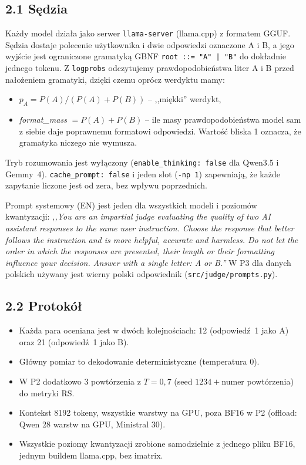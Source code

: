 \documentclass[10pt,a4paper]{article}
\begin{document}
\subsection*{2.1 Sędzia}
Każdy model działa jako serwer \texttt{llama-server} (llama.cpp) z formatem GGUF. Sędzia dostaje polecenie użytkownika i dwie odpowiedzi oznaczone A i B, a jego wyjście jest ograniczone gramatyką GBNF \texttt{root ::= "A" | "B"} do dokładnie jednego tokenu. Z \texttt{logprobs} odczytujemy prawdopodobieństwa liter A i B przed nałożeniem gramatyki, dzięki czemu oprócz werdyktu mamy:
\begin{itemize}
  \item $p_A = P(A)/(P(A)+P(B))$ -- ,,miękki'' werdykt,
  \item \emph{format\_mass} $=P(A)+P(B)$ -- ile masy prawdopodobieństwa model sam z siebie daje poprawnemu formatowi odpowiedzi. Wartość bliska 1 oznacza, że gramatyka niczego nie wymusza.
\end{itemize}
Tryb rozumowania jest wyłączony (\texttt{enable\_thinking: false} dla Qwen3.5 i Gemmy~4). \texttt{cache\_prompt: false} i jeden slot (\texttt{-np 1}) zapewniają, że każde zapytanie liczone jest od zera, bez wpływu poprzednich.

Prompt systemowy (EN) jest jeden dla wszystkich modeli i poziomów kwantyzacji: \emph{,,You are an impartial judge evaluating the quality of two AI assistant responses to the same user instruction. Choose the response that better follows the instruction and is more helpful, accurate and harmless. Do not let the order in which the responses are presented, their length or their formatting influence your decision. Answer with a single letter: A or B.''} W P3 dla danych polskich używany jest wierny polski odpowiednik (\texttt{src/judge/prompts.py}).

\subsection*{2.2 Protokół}
\begin{itemize}
  \item Każda para oceniana jest w dwóch kolejnościach: 12 (odpowiedź~1 jako A) oraz 21 (odpowiedź~1 jako B).
  \item Główny pomiar to dekodowanie deterministyczne (temperatura 0).
  \item W P2 dodatkowo 3 powtórzenia z $T=0{,}7$ (seed $1234+$numer powtórzenia) do metryki RS.
  \item Kontekst 8192 tokeny, wszystkie warstwy na GPU, poza BF16 w P2 (offload: Qwen 28 warstw na GPU, Ministral 30).
  \item Wszystkie poziomy kwantyzacji zrobione samodzielnie z jednego pliku BF16, jednym buildem llama.cpp, bez imatrix.
\end{itemize}
\end{document}
